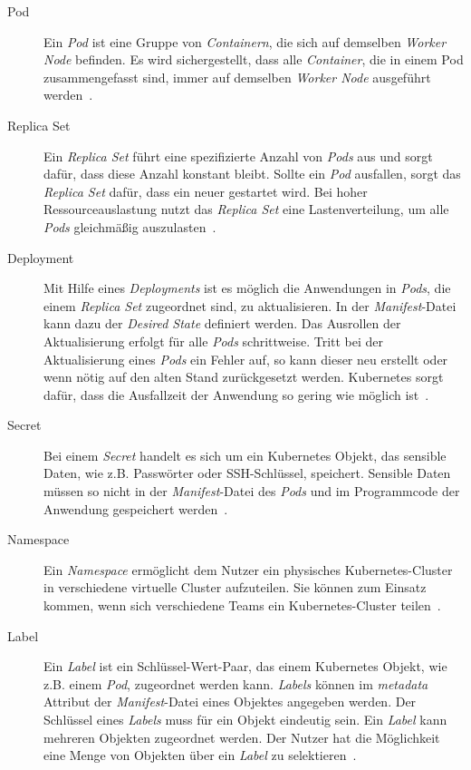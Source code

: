 \begin{description}
    \item[Pod]
          Ein \textit{Pod} ist eine Gruppe von \textit{Containern}, die sich auf demselben \textit{Worker Node} befinden.
          Es wird sichergestellt, dass alle \textit{Container}, die in einem Pod zusammengefasst sind,
          immer auf demselben \textit{Worker Node} ausgeführt werden~\cite{kubernetes-objects-kodekloud,kubernetes-in-action-chapter-3}.
    \item[Replica Set]
          Ein \textit{Replica Set} führt eine spezifizierte Anzahl von \textit{Pods} aus und sorgt dafür, dass diese Anzahl konstant bleibt.
          Sollte ein \textit{Pod} ausfallen, sorgt das \textit{Replica Set} dafür, dass ein neuer gestartet wird. Bei hoher Ressourceauslastung
          nutzt das \textit{Replica Set} eine Lastenverteilung, um alle \textit{Pods} gleichmäßig auszulasten~\cite{kubernetes-replica-set-kubematic}.
    \item[Deployment]
          Mit Hilfe eines \textit{Deployments} ist es möglich die Anwendungen in \textit{Pods}, die einem \textit{Replica Set} zugeordnet sind, zu aktualisieren.
          In der \textit{Manifest}-Datei kann dazu der \textit{Desired State} definiert werden.
          Das Ausrollen der Aktualisierung erfolgt für alle \textit{Pods} schrittweise.
          Tritt bei der Aktualisierung eines \textit{Pods} ein Fehler auf, so kann dieser neu erstellt oder wenn nötig auf den alten Stand zurückgesetzt werden.
          Kubernetes sorgt dafür, dass die Ausfallzeit der Anwendung so gering wie möglich ist~\cite{kubernetes-in-action-chapter-9,kubernetes-deployment-vmware}.
    \item[Secret]
          Bei einem \textit{Secret} handelt es sich um ein Kubernetes Objekt, das sensible Daten, wie z.B. Passwörter oder SSH-Schlüssel, speichert.
          Sensible Daten müssen so nicht in der \textit{Manifest}-Datei des \textit{Pods} und im Programmcode der Anwendung gespeichert werden~\cite{kubernetes-secrets,kubernetes-secrets-medium}.
    \item[Namespace]
          Ein \textit{Namespace} ermöglicht dem Nutzer ein physisches Kubernetes-Cluster in verschiedene virtuelle Cluster aufzuteilen.
          Sie können zum Einsatz kommen, wenn sich verschiedene Teams ein Kubernetes-Cluster teilen~\cite{kubernetes-namespaces-vmware}.
    \item[Label]
          Ein \textit{Label} ist ein Schlüssel-Wert-Paar, das einem Kubernetes Objekt, wie z.B. einem \textit{Pod}, zugeordnet werden kann.
          \textit{Labels} können im \textit{metadata} Attribut der \textit{Manifest}-Datei eines Objektes angegeben werden.
          Der Schlüssel eines \textit{Labels} muss für ein Objekt eindeutig sein. Ein \textit{Label} kann mehreren Objekten zugeordnet werden.
          Der Nutzer hat die Möglichkeit eine Menge von Objekten über ein \textit{Label} zu selektieren~\cite{kubernetes-labels}.
\end{description}

